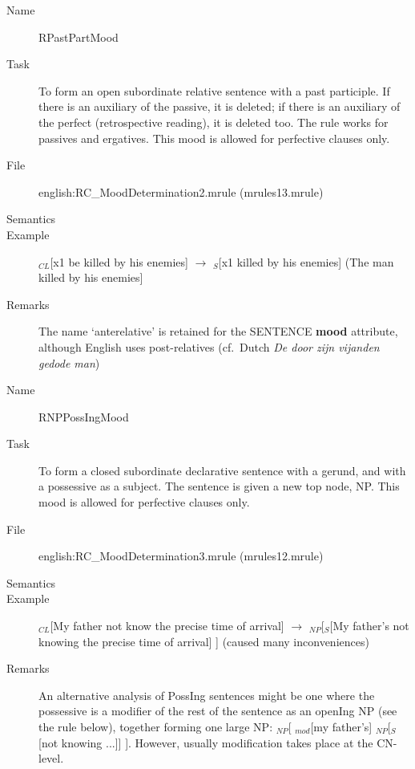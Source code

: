 \begin{description}
\vspace{1 cm}
\begin{description}
\item[Name] RPastPartMood
\item[Task] To form an open subordinate relative sentence with a past 
participle. If there is an auxiliary of the passive, it is deleted; if there 
is an auxiliary of the perfect (retrospective reading), it is deleted too. 
The rule works for passives and ergatives.
This mood is allowed for perfective clauses only. 
\item[File] english:RC\_MoodDetermination2.mrule (mrules13.mrule)
\item[Semantics]
\item[Example] $_{CL}$[x1 be killed by his enemies] $\rightarrow$ $_S$[x1 
killed by his enemies] (The man killed by his enemies]
\item[Remarks] The name `anterelative' is retained for the SENTENCE {\bf mood} 
attribute, although English uses 
post-relatives (cf.\ Dutch {\em De door zijn vijanden gedode man\/})
\end{description}

\vspace{1 cm}
\begin{description}
\item[Name] RNPPossIngMood
\item[Task] To form a closed subordinate declarative sentence with a gerund, 
and with a possessive as a subject. The sentence is given a new top node, 
NP. 
This mood is allowed for perfective clauses only. 
\item[File] english:RC\_MoodDetermination3.mrule (mrules12.mrule)
\item[Semantics]
\item[Example] $_{CL}$[My father not know the precise time of arrival] 
$\rightarrow$ $_{NP}$[$_S$[My father's not knowing the precise time of arrival]
] (caused many inconveniences)
\item[Remarks]
An alternative analysis of PossIng sentences might be one where the possessive 
is a modifier of the rest of the sentence as an openIng NP (see the rule below),
together forming 
one large NP: $_{NP}$[ $_{mod}$[my father's] $_{NP}$[$_S$[not knowing ...]] ].
However, usually modification takes place at the CN-level.
\end{description}



\end{description}
